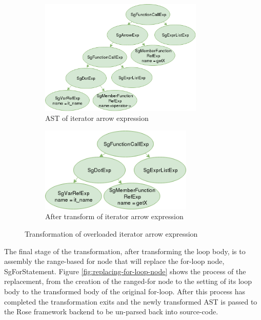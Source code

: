 \documentclass[bsc,frontabs,singlespacing,twoside,parskip,deptreport]{infthesis}
\begin{document}
\begin{figure}[H]
    \begin{subfigure}[b]{0.5\textwidth}
        \centering
            \includegraphics[height=5.5cm]{images/iterator-arrow-replace-ast.png}
        \caption{AST of iterator arrow expression}
        \label{fig:iter-AST-Trans-arrow-before}
    \end{subfigure}
    \hfill
    \begin{subfigure}[b]{0.5\textwidth}
        \centering
            \includegraphics[width=0.8\textwidth]{images/iterator-arrow-replace-ast-after.png}
        \caption{After transform of iterator arrow expression}
        \label{fig:iter-AST-Trans-arrow-after}
    \end{subfigure}
    \vspace{-0.5cm}
    \caption{Transformation of overloaded iterator arrow expression}
    \label{fig:iter-arrow-use-trans}
\end{figure}


The final stage of the transformation, after transforming the loop body, is to assembly the range-based for node that will replace the for-loop node, SgForStatement. Figure \ref{fig:replacing-for-loop-node} shows the process of the replacement, from the creation of the ranged-for node to the setting of its loop body to the transformed body of the original for-loop. After this process has completed the transformation exits and the newly transformed AST is passed to the Rose framework backend to be un-parsed back into source-code.
\end{document}
